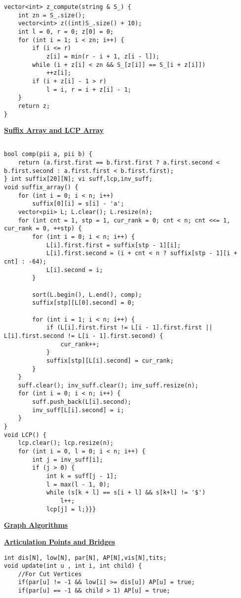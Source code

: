 \documentclass[10pt,a4paper]{report}
\begin{document}
\begin{landscape}
\begin{multicols}{2}
\begin{verbatim}
vector<int> z_compute(string & S_) {
	int zn = S_.size();
	vector<int> z((int)S_.size() + 10); 
	int l = 0, r = 0; z[0] = 0; 
	for (int i = 1; i < zn; i++) {
		if (i <= r)
			z[i] = min(r - i + 1, z[i - l]);
		while (i + z[i] < zn && S_[z[i]] == S_[i + z[i]])
			++z[i];
		if (i + z[i] - 1 > r)
			l = i, r = i + z[i] - 1;
	}
	return z; 
}
\end{verbatim}

\begin{flushleft}
\textbf{\underline{Suffix Array and LCP Array}}
\end{flushleft}

\begin{verbatim}

bool comp(pii a, pii b) {
	return (a.first.first == b.first.first ? a.first.second < b.first.second : a.first.first < b.first.first);
} int suffix[20][N]; vi suff,lcp,inv_suff;
void suffix_array() {
	for (int i = 0; i < n; i++)
		suffix[0][i] = s[i] - 'a';
	vector<pii> L; L.clear(); L.resize(n);
	for (int cnt = 1, stp = 1, cur_rank = 0; cnt < n; cnt <<= 1, cur_rank = 0, ++stp) {
		for (int i = 0; i < n; i++) {
			L[i].first.first = suffix[stp - 1][i];
			L[i].first.second = (i + cnt < n ? suffix[stp - 1][i + cnt] : -64);
			L[i].second = i;
		}

		sort(L.begin(), L.end(), comp);
		suffix[stp][L[0].second] = 0;

		for (int i = 1; i < n; i++) {
			if (L[i].first.first != L[i - 1].first.first || L[i].first.second != L[i - 1].first.second) {
				cur_rank++;
			}
			suffix[stp][L[i].second] = cur_rank;
		}
	}
	suff.clear(); inv_suff.clear(); inv_suff.resize(n);
	for (int i = 0; i < n; i++) {
		suff.push_back(L[i].second);
		inv_suff[L[i].second] = i;
	}
}
void LCP() {
	lcp.clear(); lcp.resize(n);
	for (int i = 0, l = 0; i < n; i++) {
		int j = inv_suff[i];
		if (j > 0) {
			int k = suff[j - 1];
			l = max(l - 1, 0);
			while (s[k + l] == s[i + l] && s[k+l] != '$')
				l++;
			lcp[j] = l;}}}
\end{verbatim}

\begin{center}
\textbf{\underline{Graph Algorithms}}
\end{center}

\begin{flushleft}
\textbf{\underline{Articulation Points and Bridges}}
\end{flushleft}

\begin{verbatim}
int dis[N], low[N], par[N], AP[N],vis[N],tits; 
void update(int u , int i, int child) {
    //For Cut Vertices
    if(par[u] != -1 && low[i] >= dis[u]) AP[u] = true;
    if(par[u] == -1 && child > 1) AP[u] = true;
    

\end{verbatim}
\end{multicols}
\end{landscape}
\end{document}
